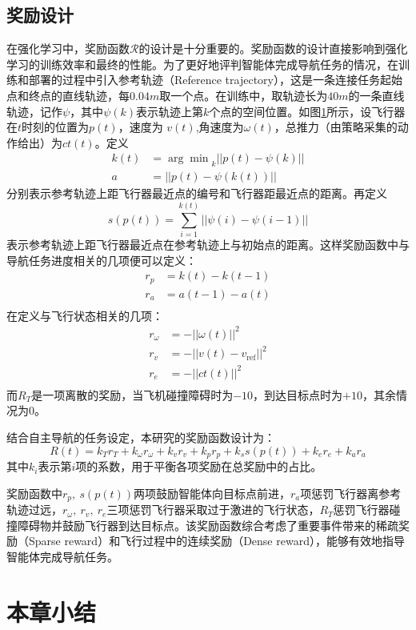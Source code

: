 \subsection{奖励设计}
\label{reward_design}
在强化学习中，奖励函数$\mathcal{R}$的设计是十分重要的。奖励函数的设计直接影响到强化学习的训练效率和最终的性能。为了更好地评判智能体完成导航任务的情况，在训练和部署的过程中引入参考轨迹（Reference trajectory），这是一条连接任务起始点和终点的直线轨迹，每$0.04m$取一个点。在训练中，取轨迹长为$40m$的一条直线轨迹，记作$\psi$，其中$\psi(k)$表示轨迹上第$k$个点的空间位置。如图\ref{}所示，设飞行器在$t$时刻的位置为$p(t)$，速度为 $v(t)$,角速度为$\omega(t)$，总推力（由策略采集的动作给出）为$ct(t)$。定义
\[\begin{aligned}
  k(t) &= {\arg\min}_k {||p(t)-\psi(k)||}\\
  a &= ||p(t)-\psi(k(t))||
\end{aligned}\]
分别表示参考轨迹上距飞行器最近点的编号和飞行器距最近点的距离。再定义
\[
  s(p(t)) = \sum_{i=1}^{k(t)} ||\psi(i)-\psi(i-1)||
\]
表示参考轨迹上距飞行器最近点在参考轨迹上与初始点的距离。这样奖励函数中与导航任务进度相关的几项便可以定义：
\[\begin{aligned}
  r_p &= k(t)-k(t-1)\\
  r_a &= a(t-1)-a(t)\\
\end{aligned}\]
在定义与飞行状态相关的几项：
\[\begin{aligned}
  r_\omega &= -||\omega(t)||^2\\
  r_v &= -||v(t)-v_\text{ref}||^2\\
  r_e & = -||ct(t)||^2\\
\end{aligned}\]
而$R_T$是一项离散的奖励，当飞机碰撞障碍时为$-10$，到达目标点时为$+10$，其余情况为$0$。

结合自主导航的任务设定，本研究的奖励函数设计为：
\[
  R(t) = k_Tr_T + k_\omega r_\omega + k_v r_v+ k_p r_p + k_s s(p(t))+ k_e r_e + k_a r_a
\]
其中$k_i$表示第$i$项的系数，用于平衡各项奖励在总奖励中的占比。

奖励函数中$r_p,\ s(p(t))$两项鼓励智能体向目标点前进，$r_a$项惩罚飞行器离参考轨迹过远，$r_\omega,\ r_v,\ r_e$三项惩罚飞行器采取过于激进的飞行状态，$R_T$惩罚飞行器碰撞障碍物并鼓励飞行器到达目标点。该奖励函数综合考虑了重要事件带来的稀疏奖励（Sparse reward）和飞行过程中的连续奖励（Dense reward），能够有效地指导智能体完成导航任务。

\section{本章小结}

